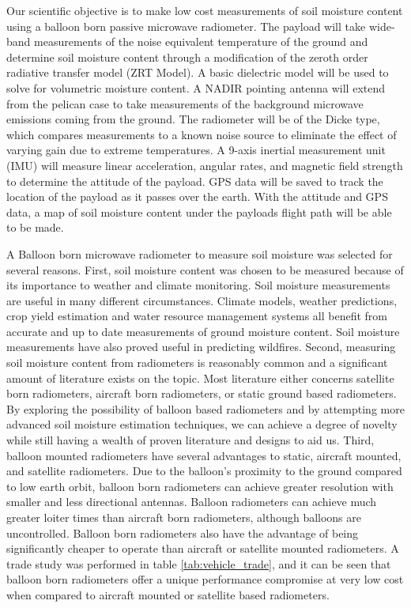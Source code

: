 \documentclass[12pt]{article}
\begin{document}
Our scientific objective is to make low cost measurements of soil moisture content using a balloon born passive microwave radiometer. The payload will take wide-band measurements of the noise equivalent temperature of the ground and determine soil moisture content through a modification of the zeroth order radiative transfer model (ZRT Model). A basic dielectric model will be used to solve for volumetric moisture content. \cite{ulaby_fung_moore_1986} A NADIR pointing antenna will extend from the pelican case to take measurements of the background microwave emissions coming from the ground. The radiometer will be of the Dicke type, which compares measurements to a known noise source to eliminate the effect of varying gain due to extreme temperatures. A 9-axis inertial measurement unit (IMU) will measure linear acceleration, angular rates, and magnetic field strength to determine the attitude of the payload. GPS data will be saved to track the location of the payload as it passes over the earth. With the attitude and GPS data, a map of soil moisture content under the payloads flight path will be able to be made. 

A Balloon born microwave radiometer to measure soil moisture was selected for several reasons. First, soil moisture content was chosen to be measured because of its importance to weather and climate monitoring.\cite{Pan2001} Soil moisture measurements are useful in many different circumstances. Climate models, weather predictions, crop yield estimation and water resource management systems all benefit from accurate and up to date measurements of ground moisture content. Soil moisture measurements have also proved useful in predicting wildfires.\cite{chaparro_piles_vall-llossera_2016,krueger_ochsner_quiring_engle_carlson_twidwell_fuhlendorf_2017} Second, measuring soil moisture content from radiometers is reasonably common and a significant amount of literature exists on the topic. Most literature either concerns satellite born radiometers, aircraft born radiometers, or static ground based radiometers. \cite{Hanington,Kerr2001,ulaby_fung_moore_1986,Friesen2008,Schmugge1994} By exploring the possibility of balloon based radiometers and by attempting more advanced soil moisture estimation techniques, we can achieve a degree of novelty while still having a wealth of proven literature and designs to aid us. Third, balloon mounted radiometers have several advantages to static, aircraft mounted, and satellite radiometers. Due to the balloon's proximity to the ground compared to low earth orbit, balloon born radiometers can achieve greater resolution with smaller and less directional antennas. Balloon radiometers can achieve much greater loiter times than aircraft born radiometers, although balloons are uncontrolled. Balloon born radiometers also have the advantage of being significantly cheaper to operate than aircraft or satellite mounted radiometers. A trade study was performed in table \ref{tab:vehicle_trade}, and it can be seen that balloon born radiometers offer a unique performance compromise at very low cost when compared to aircraft mounted or satellite based radiometers.
\end{document}
